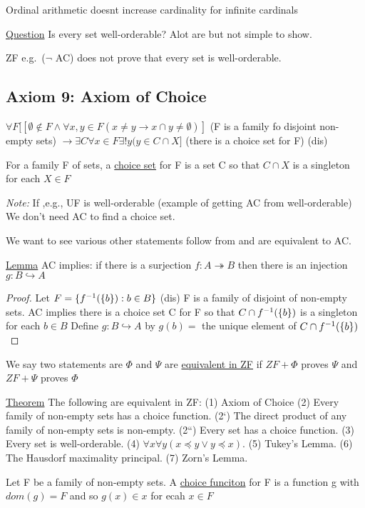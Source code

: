 Ordinal arithmetic doesnt increase cardinality for infinite cardinals

\underline{Question} Is every set well-orderable?
Alot are but not simple to show.

ZF e.g.\ ($\neg$ AC) does not prove that every set is well-orderable.

\subsection{Axiom 9: Axiom of Choice}
$\forall F [[\emptyset \notin F \wedge \forall x ,y \in F (x \neq y \rightarrow x \cap y \neq \emptyset)]$
(F is a family fo disjoint non-empty sets)
$\rightarrow \exists C \forall x \in F \exists! y (y \in C \cap X]$
(there is a choice set for F)
(dis)

\dfn For a family F of sets, a \underline{choice set} for F is a set C so that $C \cap X$ is a singleton for each $X \in F$

\emph{Note:} If ,e.g., UF is well-orderable (example of getting AC from well-orderable)
We don't need AC to find a choice set.

We want to see various other statements follow from and are equivalent to AC.

\underline{Lemma}
AC implies: if there is a surjection $f: A \twoheadrightarrow B$ then there is an injection $g: B \hookrightarrow A$

\begin{proof}
    Let $F = \{f^{-1}(\{b\}): b \in B\}$ (dis)
    F is a family of disjoint of non-empty sets.
    AC implies there is a choice set C for F so that $C \cap f^{-1}(\{b\})$ is a singleton for each $b \in B$
    Define $g: B \hookrightarrow A$ by $g(b) = $ the unique element of $C \cap f^{-1}(\{b\})$

\end{proof}

\dfn We say two statements are $\Phi$ and $\Psi$ are \underline{equivalent in ZF} if
$ZF + \Phi$ proves $\Psi$ and $ZF+\Psi$ proves $\Phi$

\underline{Theorem} The following are equivalent in ZF:
(1) Axiom of Choice
(2) Every family of non-empty sets has a choice function.
(2`) The direct product of any family of non-empty sets  is non-empty.
(2``) Every set has a choice function.
(3) Every set is well-orderable.
(4) $\forall x \forall y (x \preceq y \vee y \preceq x)$.
(5) Tukey's Lemma.
(6) The Hausdorf maximality principal.
(7) Zorn's Lemma.

\dfn Let F be a family of non-empty sets.
A \underline{choice funciton} for F is a function g with $dom(g) = F$ and so $g(x) \in x$ for ecah $x \in F$

